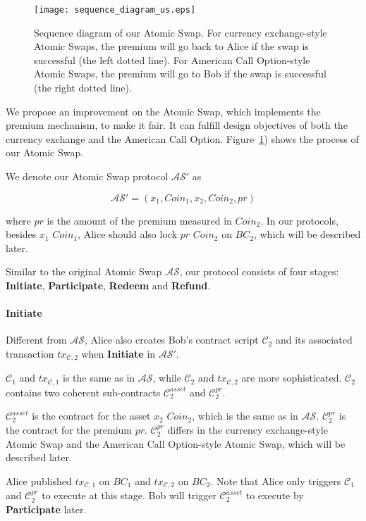 \begin{figure}[htp]
    \texttt{[image: sequence\_diagram\_us.eps]}
    \caption{Sequence diagram of our Atomic Swap.
    For currency exchange-style Atomic Swaps, the premium will go back to Alice if the swap is successful (the left dotted line).
    For American Call Option-style Atomic Swaps, the premium will go to Bob if the swap is successful (the right dotted line).}
    \label{fig:sequence_diagram_us}
\end{figure}

We propose an improvement on the Atomic Swap, which implements the premium mechanism, to make it fair.
It can fulfill design objectives of both the currency exchange and the American Call Option.
Figure~\ref{fig:sequence_diagram_us}) shows the process of our Atomic Swap.

We denote our Atomic Swap protocol $\mathcal{AS}'$ as

$$\mathcal{AS}' = (x_1, Coin_1, x_2, Coin_2, pr)$$

where $pr$ is the amount of the premium measured in $Coin_2$.
In our protocols, besides $x_1$ $Coin_1$, Alice should also lock $pr$ $Coin_2$ on $BC_2$, which will be described later.

Similar to the original Atomic Swap $\mathcal{AS}$, our protocol consists of four stages:
\textbf{Initiate}, \textbf{Participate}, \textbf{Redeem} and \textbf{Refund}.

\paragraph{\textbf{Initiate}}
Different from $\mathcal{AS}$, Alice also creates Bob's contract script $\mathcal{C}_2$ and its associated transaction $tx_{\mathcal{C}, 2}$ when \textbf{Initiate} in $\mathcal{AS}'$.

$\mathcal{C}_1$ and $tx_{\mathcal{C}, 1}$ is the same as in $\mathcal{AS}$,
while $\mathcal{C}_2$ and $tx_{\mathcal{C}, 2}$ are more sophisticated.
$\mathcal{C}_2$ contains two coherent sub-contracts $\mathcal{C}^{asset}_2$ and $\mathcal{C}^{pr}_2$.

$\mathcal{C}^{asset}_2$ is the contract for the asset $x_2$ $Coin_2$, which is the same as in $\mathcal{AS}$.
$\mathcal{C}^{pr}_2$ is the contract for the premium $pr$.
$\mathcal{C}^{pr}_2$ differs in the currency exchange-style Atomic Swap and the American Call Option-style Atomic Swap, which will be described later.

Alice published $tx_{\mathcal{C}, 1}$ on $BC_1$ and $tx_{\mathcal{C}, 2}$ on $BC_2$.
Note that Alice only triggers $\mathcal{C}_1$ and $\mathcal{C}^{pr}_2$ to execute at this stage.
Bob will trigger $\mathcal{C}^{asset}_2$ to execute by \textbf{Participate} later.

